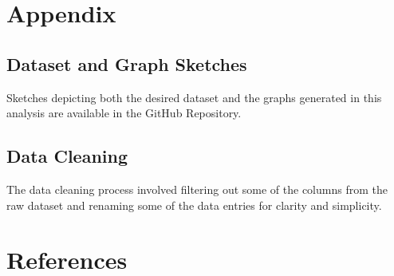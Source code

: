 \documentclass[
  letterpaper,
  DIV=11,
  numbers=noendperiod]{scrartcl}
\begin{document}
\newpage

\appendix

\section{Appendix}\label{sec-appendix}

\subsection{Dataset and Graph Sketches}\label{sec-appendix-sketches}

Sketches depicting both the desired dataset and the graphs generated in
this analysis are available in the GitHub Repository.

\subsection{Data Cleaning}\label{sec-appendix-cleaning}

The data cleaning process involved filtering out some of the columns
from the raw dataset and renaming some of the data entries for clarity
and simplicity.

\newpage

\section*{References}\label{sec-references}
\end{document}
